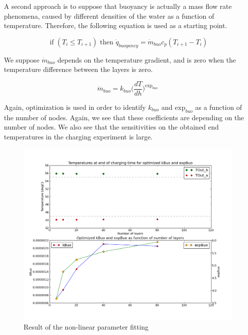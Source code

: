 A second approach is to suppose that buoyancy is actually a mass flow rate phenomena, caused by different densities of the water as a function of temperature.  Therefore, the following equation is used as a starting point.

\begin{equation}
\text{ if } (T_{i} \leq T_{i+1}) \text{ then } \dot{q}_{buoyancy} = \dot{m}_{buo} c_p (T_{i+1}-T_i)
\label{eq:}
\end{equation}

We suppose $\dot{m}_{buo}$ depends on the temperature gradient, and is zero when the temperature difference between the layers is zero.

\begin{equation}
\dot{m}_{buo} = k_{buo} {(\frac{dT}{dh}})^{\text{exp}_{buo}}
\label{eq:}
\end{equation}

Again, optimization is used in order to identify $k_{buo}$ and $\text{exp}_{buo}$ as a function of the number of nodes. Again, we see that these coefficients are depending on the number of nodes.  We also see that the sensitivities on the obtained end temperatures in the charging experiment is large.

\begin{figure}%
\includegraphics[width=\columnwidth]{Thermal/images/Validation_Vitocell100V390l_ChargingTimeEndTemperatures_NonLinear.png}%
\caption{Result of the non-linear parameter fitting}%
\label{tankinternal}%
\end{figure}

